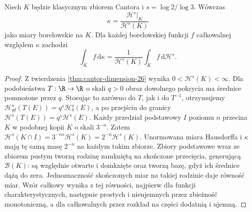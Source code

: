 \begin{wniosek}\label{it:cor:cantor-hausdorff}
Niech $K$ będzie klasycznym zbiorem Cantora i $s=\log2/\log3$. Wówczas
\[
 \kappa=\frac{\mathcal H^s|_K}{\mathcal H^s(K)}
\]
jako miary borelowskie na $K$. Dla każdej borelowskiej funkcji $f$ całkowalnej względem $\kappa$ zachodzi
\[
 \int_K f\,\mathrm d\kappa
 =\frac{1}{\mathcal H^s(K)}\int_K f\,\mathrm d\mathcal H^s.
\]
\end{wniosek}
\begin{proof}
Z twierdzenia \ref{thm:cantor-dimension-26} wynika $0<\mathcal H^s(K)<\infty$. Dla podobieństwa $T:\R\to\R$ o skali $q>0$ obraz dowolnego pokrycia ma średnice pomnożone przez $q$. Stosując to zarówno do $T$, jak i do $T^{-1}$, otrzymujemy $\mathcal H^s_{q\delta}(T(E))=q^s\mathcal H^s_\delta(E)$, a po przejściu do granicy $\mathcal H^s(T(E))=q^s\mathcal H^s(E)$. Każdy przedział podstawowy $I$ poziomu $n$ przecina $K$ w podobnej kopii $K$ o skali $3^{-n}$. Zatem $\mathcal H^s(K\cap I)=3^{-ns}\mathcal H^s(K)=2^{-n}\mathcal H^s(K)$. Unormowana miara Hausdorffa i $\kappa$ mają tę samą masę $2^{-n}$ na każdym takim zbiorze. Zbiory podstawowe wraz ze zbiorem pustym tworzą rodzinę zamkniętą na skończone przecięcia, generującą $\mathcal B(K)$: są względnie otwarte i domknięte oraz tworzą bazę, gdyż ich średnice dążą do zera. Jednoznaczność skończonych miar na takiej rodzinie daje równość miar. Wzór całkowy wynika z tej równości, najpierw dla funkcji charakterystycznych, następnie prostych i nieujemnych przez zbieżność monotoniczną, a dla całkowalnych przez rozkład na części dodatnią i ujemną.
\end{proof}
